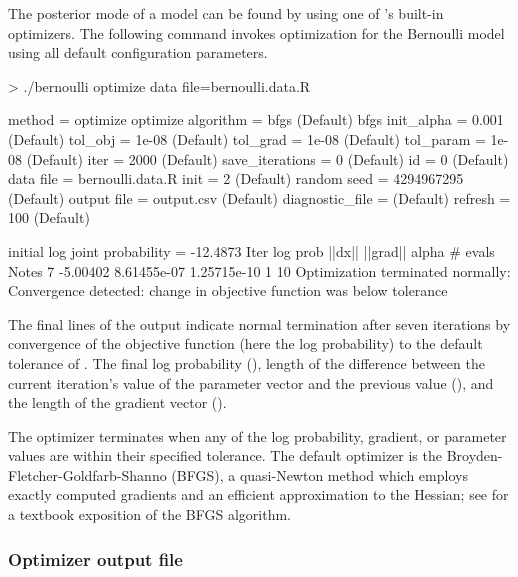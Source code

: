 \documentclass[article]{jss}
\begin{document}
The posterior mode of a model can be found by using one of
's built-in optimizers.  The following command invokes
optimization for the Bernoulli model using all default configuration
parameters.
%
\begin{CodeChunk}
\begin{CodeInput}
> ./bernoulli optimize data file=bernoulli.data.R 
\end{CodeInput}
\begin{CodeOutput}
 method = optimize
   optimize
     algorithm = bfgs (Default)
       bfgs
         init_alpha = 0.001 (Default)
         tol_obj = 1e-08 (Default)
         tol_grad = 1e-08 (Default)
         tol_param = 1e-08 (Default)
     iter = 2000 (Default)
     save_iterations = 0 (Default)
 id = 0 (Default)
 data
   file = bernoulli.data.R
 init = 2 (Default)
 random
   seed = 4294967295 (Default)
 output
   file = output.csv (Default)
   diagnostic_file =  (Default)
   refresh = 100 (Default)

initial log joint probability = -12.4873
    Iter      log prob        ||dx||      ||grad||       alpha  # evals  Notes 
       7      -5.00402   8.61455e-07   1.25715e-10           1       10   
Optimization terminated normally: 
  Convergence detected: change in objective function was below
  tolerance
\end{CodeOutput}
\end{CodeChunk}
%
The final lines of the output indicate normal termination after seven
iterations by convergence of the objective function (here the log
probability) to the default tolerance of . The final log
probability (), length of the difference between the
current iteration's value of the parameter vector and the previous
value (), and the length of the gradient vector
().

 The optimizer
terminates when any of the log probability, gradient, or parameter
values are within their specified tolerance.  The default optimizer is
the Broyden-Fletcher-Goldfarb-Shanno (BFGS), a quasi-Newton method
which employs exactly computed gradients and an efficient
approximation to the Hessian; see \citep{NocedalWright:2006} for a
textbook exposition of the BFGS algorithm.

\subsubsection{Optimizer output file}
\end{document}
